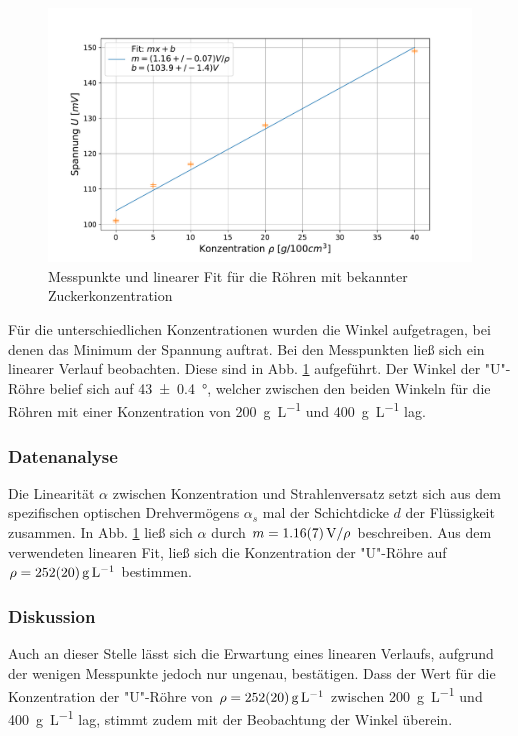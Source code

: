 		\begin{figure}[ht]
			\centering
			\includegraphics[width=\textwidth]{data/konzentration.pdf}
			\caption{Messpunkte und linearer Fit für die Röhren mit bekannter Zuckerkonzentration}
			\label{fig:ZuckerGerade}	
		\end{figure}
		Für die unterschiedlichen Konzentrationen wurden die Winkel aufgetragen, bei denen das Minimum der Spannung auftrat.
		Bei den Messpunkten ließ sich ein linearer Verlauf beobachten.
		Diese sind in Abb. \ref{fig:ZuckerGerade} aufgeführt.
		Der Winkel der "U"-Röhre belief sich auf \SI{43+-0,4}{\degree}, welcher zwischen den beiden Winkeln für die Röhren mit einer Konzentration von \SI{200}{\gram\per\liter} und \SI{400}{\gram\per\liter} lag.		
	
	\subsubsection*{Datenanalyse}
		
		Die Linearität $\alpha$ zwischen Konzentration und Strahlenversatz setzt sich aus dem spezifischen optischen Drehvermögens $\alpha_s$ mal der Schichtdicke $d$ der Flüssigkeit zusammen.
		In Abb. \ref{fig:ZuckerGerade} ließ sich $\alpha$ durch $m=\SI{1,16+-0,07}{\volt\per\rho}$ beschreiben. %
		Aus dem verwendeten linearen Fit, ließ sich die Konzentration der "U"-Röhre auf $\rho = \SI{252+-20}{\gram\per\liter}$ bestimmen.
	
	\subsubsection*{Diskussion}
	
		Auch an dieser Stelle lässt sich die Erwartung eines linearen Verlaufs, aufgrund der wenigen Messpunkte jedoch nur ungenau, bestätigen.
		Dass der Wert für die Konzentration der "U"-Röhre von $\rho = \SI{252+-20}{\gram\per\liter}$ zwischen \SI{200}{\gram\per\liter} und \SI{400}{\gram\per\liter} lag, stimmt zudem mit der Beobachtung der Winkel überein.
		
